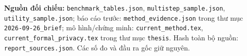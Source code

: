 \documentclass[10pt,a4paper]{article}
\begin{document}
{\footnotesize\color{gray}\textbf{Nguồn đối chiếu:} \texttt{benchmark\_tables.json}, \texttt{multistep\_sample.json}, \texttt{utility\_sample.json};
báo cáo trước: \texttt{method\_evidence.json} trong thư mục \texttt{2026-09-26\_brief}; mô hình/chứng minh:
\texttt{current\_method.tex}, \texttt{current\_formal\_privacy.tex} trong thư mục \texttt{thesis}.
Hash toàn bộ nguồn: \texttt{report\_sources.json}. Các số đo và đầu ra gốc giữ nguyên.}
\end{document}
